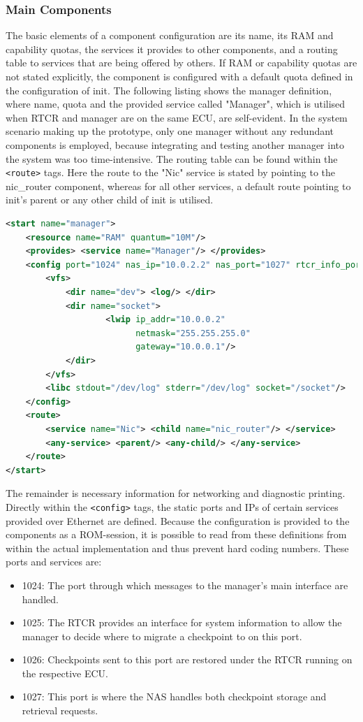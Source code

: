 \subsubsection{Main Components}
The basic elements of a component configuration are its name, its RAM and capability quotas, the services it provides to other components, and a routing table to services that are being offered by others. If RAM or capability quotas are not stated explicitly, the component is configured with a default quota defined in the configuration of init. The following listing shows the manager definition, where name, quota and the provided service called "Manager", which is utilised when RTCR and manager are on the same ECU, are self-evident. In the system scenario making up the prototype, only one manager without any redundant components is employed, because integrating and testing another manager into the system was too time-intensive. The routing table can be found within the \verb|<route>| tags. Here the route to the "Nic" service is stated by pointing to the nic\_router component, whereas for all other services, a default route pointing to init's parent or any other child of init is utilised. \cite{init_config}
\begin{lstlisting}[language=XML, caption={Configuration of the manager component.}]
<start name="manager">
    <resource name="RAM" quantum="10M"/>
    <provides> <service name="Manager"/> </provides>
    <config port="1024" nas_ip="10.0.2.2" nas_port="1027" rtcr_info_port="1025" rtcr_migr_port="1026">
        <vfs>
            <dir name="dev"> <log/> </dir>
            <dir name="socket">
                    <lwip ip_addr="10.0.0.2"
                          netmask="255.255.255.0"
                          gateway="10.0.0.1"/>
            </dir>
        </vfs>
        <libc stdout="/dev/log" stderr="/dev/log" socket="/socket"/>
    </config>
    <route>
		<service name="Nic"> <child name="nic_router"/> </service>
		<any-service> <parent/> <any-child/> </any-service>
	</route>
</start>
\end{lstlisting}
The remainder is necessary information for networking and diagnostic printing. Directly within the \verb|<config>| tags, the static ports and IPs of certain services provided over Ethernet are defined. Because the configuration is provided to the components as a ROM-session, it is possible to read from these definitions from within the actual implementation and thus prevent hard coding numbers. These ports and services are:
\begin{itemize}
    \item 1024: The port through which messages to the manager's main interface are handled.
    \item 1025: The RTCR provides an interface for system information to allow the manager to decide where to migrate a checkpoint to on this port.
    \item 1026: Checkpoints sent to this port are restored under the RTCR running on the respective ECU.
    \item 1027: This port is where the NAS handles both checkpoint storage and retrieval requests.
\end{itemize}
